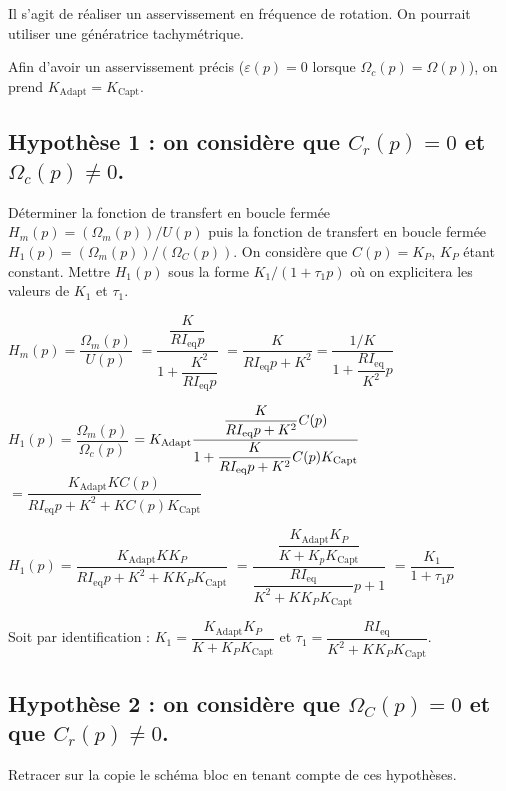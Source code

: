 \ifprof
\begin{corrige}
Il s'agit de réaliser un asservissement en fréquence de rotation. On pourrait utiliser une génératrice tachymétrique. 

Afin d'avoir un asservissement précis ($\varepsilon(p)=0$ lorsque $\Omega_c(p)=\Omega(p)$), on prend $K_{\text{Adapt}}=K_{\text{Capt}}$.
\end{corrige}
\else
\fi


\subsection*{Hypothèse 1 : on considère que $C_r (p)=0$ et $\Omega_c (p)\neq 0$.}
\begin{question}
Déterminer la fonction de transfert en boucle fermée $H_m (p)=(\Omega_m (p))/U(p)$ puis la fonction de transfert en boucle fermée $H_1 (p)=(\Omega_m (p))/(\Omega_C (p))$. On considère que $C(p)=K_P$, $K_P$ étant constant. Mettre $H_1 (p)$ sous la forme $K_1/(1+\tau_1 p)$ où on explicitera les valeurs de $K_1$ et $\tau_1$.
\end{question}

\ifprof
\begin{corrige}
$H_m (p)=\dfrac{\Omega_m (p)}{U(p)} $
$= \dfrac{\dfrac{K}{RI_{\text{eq}}p}}{1+\dfrac{K^2}{ RI_{\text{eq}}p}}$
$=\dfrac{K}{R I_{\text{eq}} p+K^2  }=\dfrac{1/K}{1+\dfrac{RI_{\text{eq}}}{K^2}p}$


$H_1 (p)=\dfrac{\Omega_m (p)}{\Omega_c (p)} $
$=K_{\text{Adapt}} \dfrac{\dfrac{K}{R I_{\text{eq}} p+K^2 } C(p)}{%
1+\dfrac{K}{R I_{\text{eq}} p+K^2 } C(p) K_{\text{Capt}} }$
$=\dfrac{K_{\text{Adapt}} K C(p)}{R I_{\text{eq}} p+K^2+K C(p) K_{\text{Capt}} }$


$H_1 (p)=\dfrac{K_{\text{Adapt}} K K_P}{R I_{\text{eq}} p+K^2+K K_P K_{\text{Capt}}}$
$=\dfrac{\dfrac{K_{\text{Adapt}} K_P}{K+K_p K_{\text{Capt}}}}{\dfrac{R I_{\text{eq}}}{K^2+K K_P K_{\text{Capt}}} p+1}$
$=\dfrac{K_1}{1+\tau_1 p}$


Soit par identification : $K_1=\dfrac{K_{\text{Adapt}} K_P}{K+K_P K_{\text{Capt}}}$	et	$\tau_1=\dfrac{R I_{\text{eq}}}{K^2+K K_P K_{\text{Capt}}}$.




\end{corrige}
\else

\fi






\subsection*{Hypothèse 2 : on considère que $\Omega_C (p)=0$ et que $C_r (p)\neq0$.}
\begin{question}
Retracer sur la copie le schéma bloc en tenant compte de ces hypothèses.
\end{question}

